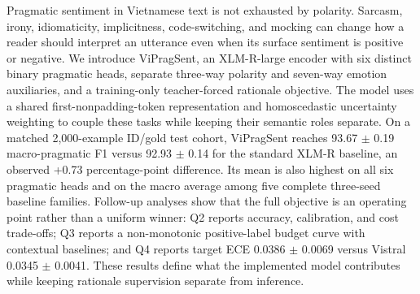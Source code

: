 Pragmatic sentiment in Vietnamese text is not exhausted by polarity. Sarcasm, irony, idiomaticity, implicitness, code-switching, and mocking can change how a reader should interpret an utterance even when its surface sentiment is positive or negative. We introduce ViPragSent, an XLM-R-large encoder with six distinct binary pragmatic heads, separate three-way polarity and seven-way emotion auxiliaries, and a training-only teacher-forced rationale objective. The model uses a shared first-nonpadding-token representation and homoscedastic uncertainty weighting to couple these tasks while keeping their semantic roles separate. On a matched 2,000-example ID/gold test cohort, ViPragSent reaches 93.67 $\pm$ 0.19 macro-pragmatic F1 versus 92.93 $\pm$ 0.14 for the standard XLM-R baseline, an observed +0.73 percentage-point difference. Its mean is also highest on all six pragmatic heads and on the macro average among five complete three-seed baseline families. Follow-up analyses show that the full objective is an operating point rather than a uniform winner: Q2 reports accuracy, calibration, and cost trade-offs; Q3 reports a non-monotonic positive-label budget curve with contextual baselines; and Q4 reports target ECE 0.0386 $\pm$ 0.0069 versus Vistral 0.0345 $\pm$ 0.0041. These results define what the implemented model contributes while keeping rationale supervision separate from inference.
